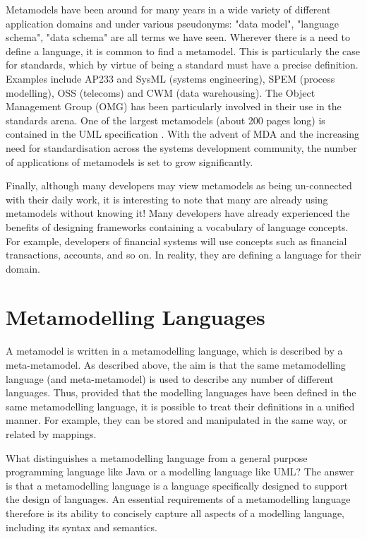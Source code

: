 Metamodels have been around for many years in a wide variety of
different application domains and under various pseudonyms: "data
model", "language schema", "data schema" are all terms we have
seen. Wherever there is a need to define a language, it is common
to find a metamodel. This is particularly the case for standards,
which by virtue of being a standard must have a precise
definition. Examples include AP233 and SysML (systems
engineering), SPEM (process modelling), OSS (telecoms) and CWM
(data warehousing). The Object Management Group (OMG) has been
particularly involved in their use in the standards arena. One of
the largest metamodels (about 200 pages long) is contained in the
UML specification \cite{umlspec}. With the advent of MDA
\cite{mda} and the increasing need for standardisation across the
systems development community, the number of applications of
metamodels is set to grow significantly.

Finally, although many developers may view metamodels as being
un-connected with their daily work, it is interesting to note that
many are already using metamodels without knowing it! Many
developers have already experienced the benefits of designing
frameworks containing a vocabulary of language concepts. For
example, developers of financial systems will use concepts such as
financial transactions, accounts, and so on. In reality, they are
defining a language for their domain.

\section{Metamodelling Languages}

A metamodel is written in a metamodelling language, which is
described by a meta-metamodel. As described above, the aim is that
the same metamodelling language (and meta-metamodel) is used to
describe any number of different languages. Thus, provided that
the modelling languages have been defined in the same
metamodelling language, it is possible to treat their definitions
in a unified manner. For example, they can be stored and
manipulated in the same way, or related by mappings.

What distinguishes a metamodelling language from a general purpose
programming language like Java or a modelling language like UML?
The answer is that a metamodelling language is a language
specifically designed to support the design of languages. An
essential requirements of a metamodelling language therefore is
its ability to concisely capture all aspects of a modelling
language, including its syntax and semantics.

